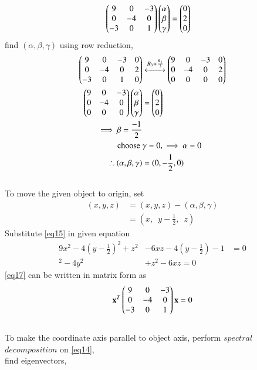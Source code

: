 \documentclass[journal,12pt,twocolumn]{IEEEtran}
\begin{document}
\begin{align}
	\begin{pmatrix}9 & 0 & -3\\0 & -4 & 0\\-3 & 0 & 1\end{pmatrix}\begin{pmatrix}\alpha \\ \beta \\ \gamma\end{pmatrix} &= \begin{pmatrix}0\\2\\0\end{pmatrix}
\end{align}
find $(\alpha, \beta, \gamma)$ using row reduction,
\begin{align}
	\begin{pmatrix}9 & 0 & -3 & 0\\0 & -4 & 0 & 2\\-3 & 0 & 1 & 0\end{pmatrix} &\xleftrightarrow[]{R_3 + \frac{R_1}{3}} \begin{pmatrix}9 & 0 & -3 & 0\\0 & -4 & 0 & 2\\0 & 0 & 0 & 0\end{pmatrix}\\
	\begin{pmatrix}9 & 0 & -3\\0 & -4 & 0\\0 & 0 & 0\end{pmatrix}\begin{pmatrix}\alpha \\ \beta \\ \gamma\end{pmatrix} &= \begin{pmatrix}0\\2\\0\end{pmatrix}\\
	\implies \beta = \frac{-1}{2}&\\
	\text{ choose } &\gamma = 0, \implies \alpha = 0\\
	\therefore (\alpha, \beta, \gamma) &= (0, -\frac{1}{2}, 0)
\end{align}
\\
To move the given object to origin, set
\begin{align}
	(x, y, z) &= (x,y,z) - (\alpha, \beta, \gamma)\\
	\label{eq15}&= (x,\enspace y - \frac{1}{2}, \enspace z)
\end{align}
Substitute \eqref{eq15} in given equation
\begin{align}
	9x^2-4\left(y - \frac{1}{2}\right)^2+z^2&-6xz-4\left(y - \frac{1}{2}\right)-1 &= 0\\
	\label{eq17}^2-4y^2&+z^2-6xz = 0
\end{align}
\eqref{eq17} can be written in matrix form as
\begin{align}
	\label{eq14}\mathbf{x}^T \begin{pmatrix}9 & 0 & -3\\0 & -4 & 0\\-3 & 0 & 1\end{pmatrix}\mathbf{x} = 0
\end{align}
\\
To make the coordinate axis parallel to object axis, perform $spectral$ $decomposition$ on \eqref{eq14},\\ find eigenvectors,
\end{document}
